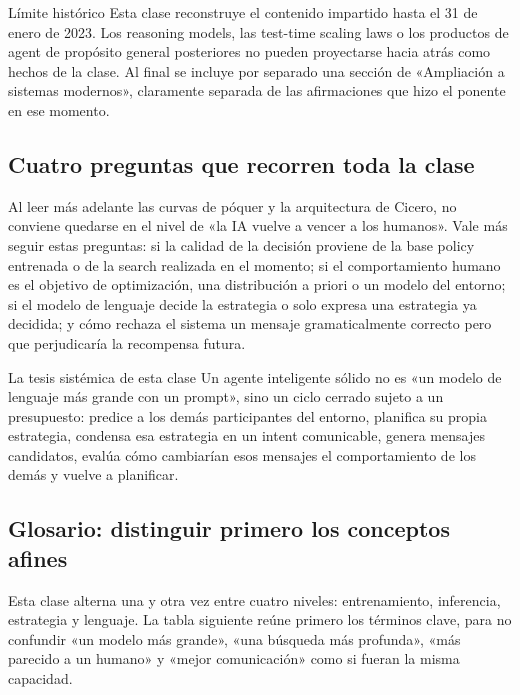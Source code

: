 \documentclass[a4paper]{article}
\begin{document}
\begin{warningbox}{Límite histórico}
Esta clase reconstruye el contenido impartido hasta el 31 de enero de 2023. Los reasoning models, las test-time scaling laws o los productos de agent de propósito general posteriores no pueden proyectarse hacia atrás como hechos de la clase. Al final se incluye por separado una sección de «Ampliación a sistemas modernos», claramente separada de las afirmaciones que hizo el ponente en ese momento.
\end{warningbox}

\subsection{Cuatro preguntas que recorren toda la clase}

Al leer más adelante las curvas de póquer y la arquitectura de Cicero, no conviene quedarse en el nivel de «la IA vuelve a vencer a los humanos». Vale más seguir estas preguntas: si la calidad de la decisión proviene de la base policy entrenada o de la search realizada en el momento; si el comportamiento humano es el objetivo de optimización, una distribución a priori o un modelo del entorno; si el modelo de lenguaje decide la estrategia o solo expresa una estrategia ya decidida; y cómo rechaza el sistema un mensaje gramaticalmente correcto pero que perjudicaría la recompensa futura.

\begin{importantbox}{La tesis sistémica de esta clase}
Un agente inteligente sólido no es «un modelo de lenguaje más grande con un prompt», sino un ciclo cerrado sujeto a un presupuesto: predice a los demás participantes del entorno, planifica su propia estrategia, condensa esa estrategia en un intent comunicable, genera mensajes candidatos, evalúa cómo cambiarían esos mensajes el comportamiento de los demás y vuelve a planificar.
\end{importantbox}

\subsection{Glosario: distinguir primero los conceptos afines}

Esta clase alterna una y otra vez entre cuatro niveles: entrenamiento, inferencia, estrategia y lenguaje. La tabla siguiente reúne primero los términos clave, para no confundir «un modelo más grande», «una búsqueda más profunda», «más parecido a un humano» y «mejor comunicación» como si fueran la misma capacidad.
\end{document}
